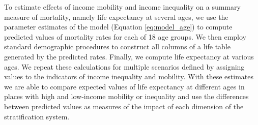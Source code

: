 \documentclass[11pt]{article}
\begin{document}
To estimate effects of income mobility and income inequality on a summary measure of mortality, namely life expectancy at several ages, we use the parameter estimates of the model (Equation \ref{eq:model_age}) to compute predicted values of mortality rates for each of 18 age groups. We then employ standard demographic procedures to construct all columns of a life table generated by the predicted rates. Finally, we compute life expectancy at various ages. We repeat these calculations for multiple scenarios defined by assigning values to the indicators of income inequality and mobility. With these estimates we are able to compare expected values of life expectancy at different ages in places with high and low-income mobility or inequality and use the differences between predicted values as measures of the impact of each dimension of the stratification system.



\end{document}
